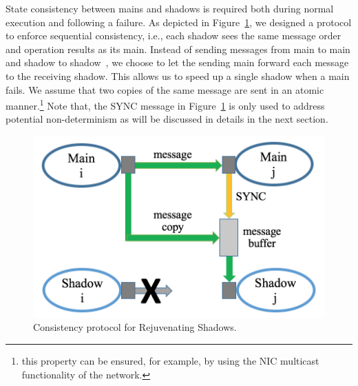 
State consistency between mains and shadows is required both during normal execution and following a failure. %
As depicted in Figure~\ref{fig:cons_protocol}, we designed a protocol
to enforce sequential consistency, i.e., each shadow sees the same message order and operation results as its main. 
Instead of sending messages from main to main and shadow to shadow~\cite{ferreira_sc_2011}, we choose to let the sending main forward each message to the receiving shadow. This allows us to speed up a single shadow when a main fails. 
We assume that two copies of the same message are sent in an atomic manner.\footnote{this property can be ensured, for example, by using the NIC multicast functionality of the network.}
Note that, the SYNC message in Figure~\ref{fig:cons_protocol} is only used to address potential non-determinism as will be discussed in details in the next section.


\begin{figure}[!t]
  \begin{center}
      	\includegraphics[width=0.7\columnwidth]{figures/consistency}
  \end{center}
  \vskip -0.2in
  \caption{Consistency protocol for Rejuvenating Shadows.}
  \label{fig:cons_protocol}
\end{figure}


